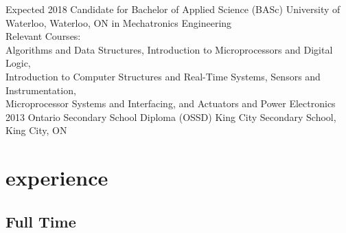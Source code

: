 \documentclass[hidelinks]{kkurucz-cv}
\begin{document}
\begin{entrylist}
\entry
{Expected 2018}
{Candidate for Bachelor of Applied Science (BASc)}
{University of Waterloo, Waterloo, ON}
{{\headingfont in Mechatronics Engineering}}
{\\Relevant Courses:
\\Algorithms and Data Structures, Introduction to Microprocessors and Digital Logic,
\\Introduction to Computer Structures and Real-Time Systems, Sensors and Instrumentation,
\\Microprocessor Systems and Interfacing, and Actuators and Power Electronics}
\entry
{2013}
{Ontario Secondary School Diploma (OSSD)}
{King City Secondary School, King City, ON}
{\null}
{\null}
\end{entrylist}


\section{experience}

\subsection{Full Time}
\end{document}
